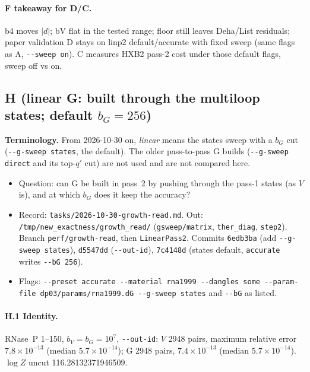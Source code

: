 \documentclass[11pt]{article}
\begin{document}
\paragraph{F takeaway for D/C.}
b4 moves $|d|$; bV flat in the tested range; floor still leaves Deha/List residuals; paper validation D stays on linp2 default/accurate with fixed sweep (same flags as A, \texttt{-{}-sweep on}). C measures HXB2 pass-2 cost under those default flags, sweep off vs on.

\subsection{H (linear G: built through the multiloop states; default $b_G=256$)}
\textbf{Terminology.} From 2026-10-30 on, \emph{linear} means the states sweep with a $b_G$ cut (\texttt{-{}-g-sweep states}, the default). The older pass-to-pass G builds (\texttt{-{}-g-sweep direct} and its top-$q'$ cut) are not used and are not compared here.
\begin{itemize}[leftmargin=*]
  \item Question: can G be built in pass~2 by pushing through the pass-1 states (as $V$ is), and at which $b_G$ does it keep the accuracy?
  \item Record: \texttt{tasks/2026-10-30-growth-read.md}. Out: \texttt{/tmp/new\_exactness/growth\_read/} (\texttt{gsweep/matrix}, \texttt{ther\_diag}, \texttt{step2}). Branch \texttt{perf/growth-read}, then \texttt{LinearPass2}. Commits \texttt{6edb3ba} (add \texttt{-{}-g-sweep states}), \texttt{d5547dd} (\texttt{-{}-out-id}), \texttt{7c4148d} (states default, \texttt{accurate} writes \texttt{-{}-bG 256}).
  \item Flags: \texttt{-{}-preset accurate -{}-material rna1999 -{}-dangles some -{}-param-file dp03/params/rna1999.dG -{}-g-sweep states} and \texttt{-{}-bG} as listed.
\end{itemize}

\paragraph{H.1 Identity.} RNase~P 1--150, $b_V=b_G=10^7$, \texttt{-{}-out-id}: $V$ 2948 pairs, maximum relative error $7.8\times10^{-13}$ (median $5.7\times10^{-14}$); G 2948 pairs, $7.4\times10^{-13}$ (median $5.7\times10^{-14}$). $\log Z$ uncut 116.28132371946509.
\end{document}

